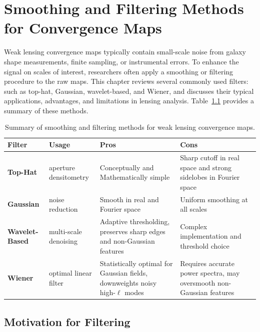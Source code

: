 \chapter{Smoothing and Filtering Methods for Convergence Maps}
\label{ch:smoothing-filters}

Weak lensing convergence maps typically contain small-scale noise from galaxy shape measurements, finite sampling, or instrumental errors. To enhance the signal on scales of interest, researchers often apply a smoothing or filtering procedure to the raw maps. This chapter reviews several commonly used filters: such as top-hat, Gaussian, wavelet-based, and Wiener, and discusses their typical applications, advantages, and limitations in lensing analysis. Table~\ref{tab:filter-summary} provides a summary of these methods.

\begin{table}[htbp]
    \centering
    \caption{Summary of smoothing and filtering methods for weak lensing convergence maps.}
    \label{tab:filter-summary}
    \begin{tabular}{p{2.3cm} p{5.0cm} p{3.8cm} p{3.8cm}}
    \hline
    \textbf{Filter} & \textbf{Usage} & \textbf{Pros} & \textbf{Cons} \\
    \hline
    \textbf{Top-Hat} & aperture densitometry & Conceptually and Mathematically simple & Sharp cutoff in real space and strong sidelobes in Fourier space \\
    \textbf{Gaussian} & noise reduction & Smooth in real and Fourier space & Uniform smoothing at all scales \\
    \hline
    \textbf{Wavelet-Based} & multi-scale denoising & Adaptive thresholding, preserves sharp edges and non-Gaussian features & Complex implementation and threshold choice \\
    \hline
    \textbf{Wiener} & optimal linear filter & Statistically optimal for Gaussian fields, downweights noisy high-\(\ell\) modes & Requires accurate power spectra, may oversmooth non-Gaussian features \\
    \hline
    \end{tabular}
    \end{table}

\section{Motivation for Filtering}
\label{sec:filter-motivation}

